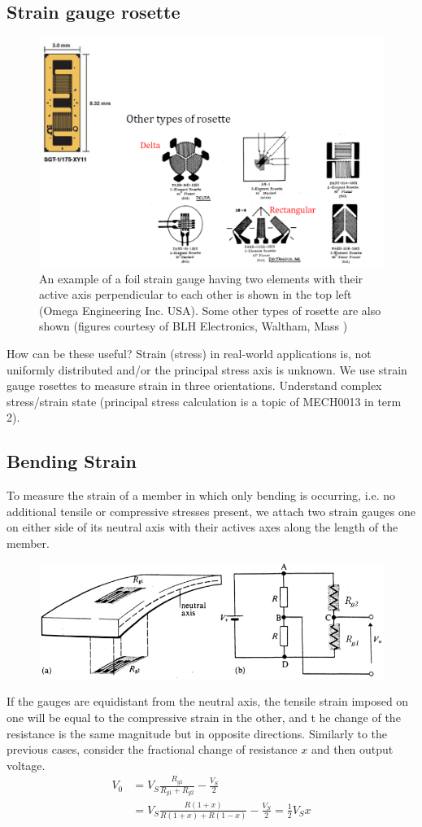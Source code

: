 \documentclass[class=report, crop=false, 12pt,a4paper, tikz, border=4mm]{standalone}
\begin{document}
\subsection{Strain gauge rosette}
\begin{figure}[H]
  \centering
  \includegraphics[width = 0.8 \textwidth]{../img/diagram15.png}
  \caption{An example of a foil strain gauge having two elements with their active axis perpendicular to each other is shown in the top left (Omega Engineering Inc. USA). Some other types of rosette are also shown (figures courtesy of BLH Electronics, Waltham, Mass )}
\end{figure}
How can be these useful? Strain (stress) in real-world applications is, not uniformly distributed and/or the principal stress axis is unknown. We use strain gauge rosettes to measure strain in three orientations. Understand complex stress/strain state (principal stress calculation is a topic of MECH0013 in term 2).
\subsection{Bending Strain}
To measure the strain of a member in which only bending is occurring, i.e. no additional tensile or compressive stresses present, we attach two strain gauges one on either side of its neutral axis with their actives axes along the length of the member.
\begin{figure}[H]
  \centering
  \includegraphics[width = 0.8 \textwidth]{../img/diagram16.png}
\end{figure}
If the gauges are equidistant from the neutral axis, the tensile strain imposed on one will be equal to the compressive strain in the other, and t he change of the resistance is the same magnitude but in opposite directions. Similarly to the previous cases, consider the fractional change of resistance $x$ and then output voltage.
\begin{align}
  V_0 &= V_S \frac{R_{g1}}{R_{g1} + R_{g2}} - \frac{V_S}{2}\\
  &= V_S \frac{R(1+x)}{R(1+x) + R(1-x)} - \frac{V_S}{2} = \frac{1}{2} V_S x
\end{align}
\end{document}
